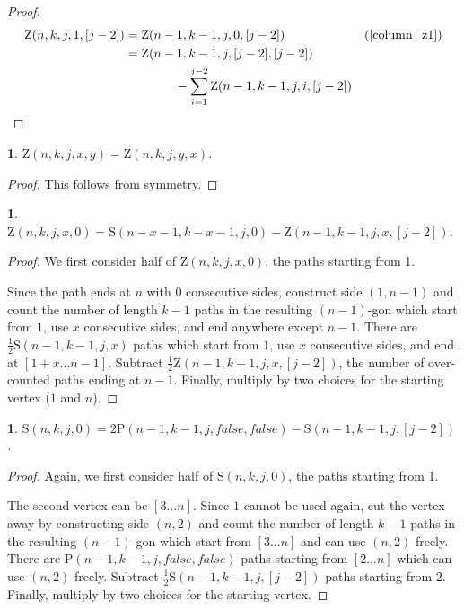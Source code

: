 \documentclass[a4paper, 12pt] {article}
\theoremstyle{remark}
\theoremstyle{plain}
\newcommand{\thistheoremname}{}
\newtheorem{genericthm}[theorem]{\thistheoremname}
\newenvironment{namedthm}[1]
  {\renewcommand{\thistheoremname}{#1}
   \begin{genericthm}}
  {\end{genericthm}}
\theoremstyle{remark}
\begin{document}
\begin{proof}
	\begin{align*}
		\mathrm{Z}(n,k,j,1,[j-2]) &=\mathrm{Z}(n-1,k-1,j,0,[j-2]) &&\text{(\ref{column_z1})} \\
		&=\mathrm{Z}(n-1,k-1,j,[j-2],[j-2]) \\
		&\qquad\qquad - \sum_{i=1}^{j-2} \mathrm{Z}(n-1,k-1,j,i,[j-2]) &&\qedhere
	\end{align*}
\end{proof}


\begin{namedthm}{Symmetry Theorem Z}
\label{symmetry_z}
$\mathrm{Z}(n,k,j,x,y)=\mathrm{Z}(n,k,j,y,x)$.
\end{namedthm}

\begin{proof}
This follows from symmetry.
\end{proof}


\begin{namedthm}{Complement Theorem}
\label{complement}
$\mathrm{Z}(n,k,j,x,0)=\mathrm{S}(n-x-1,k-x-1,j,0)-\mathrm{Z}(n-1,k-1,j,x,[j-2])$.
\end{namedthm}

\begin{proof}
We first consider half of $\mathrm{Z}(n,k,j,x,0)$, the paths starting from 1.

Since the path ends at $n$ with $0$ consecutive sides, construct side $(1,n-1)$ and count the number of length $k-1$ paths in the resulting $(n-1)$-gon which start from $1$, use $x$ consecutive sides, and end anywhere except $n-1$. There are $\frac{1}{2}\mathrm{S}(n-1,k-1,j,x)$ paths which start from $1$, use $x$ consecutive sides, and end at $[1+x...n-1]$. Subtract $\frac{1}{2}\mathrm{Z}(n-1,k-1,j,x,[j-2])$, the number of over-counted paths ending at $n-1$. Finally, multiply by two choices for the starting vertex ($1$ and $n$).
\end{proof}


\begin{namedthm}{Vertex Removal Theorem S1}
\label{vertex_removal_s1}
$\mathrm{S}(n,k,j,0)=2\mathrm{P}(n-1,k-1,j,false, \allowbreak false)-\mathrm{S}(n-1,k-1,j,[j-2])$.
\end{namedthm}

\begin{proof}
Again, we first consider half of $\mathrm{S}(n,k,j,0)$, the paths starting from 1.

The second vertex can be $[3...n]$. Since $1$ cannot be used again, cut the vertex away by constructing side $(n,2)$ and count the number of length $k-1$ paths in the resulting $(n-1)$-gon which start from $[3...n]$ and can use $(n,2)$ freely. There are $\mathrm{P}(n-1,k-1,j,false,false)$ paths starting from $[2...n]$ which can use $(n,2)$ freely. Subtract $\frac{1}{2}\mathrm{S}(n-1,k-1,j,[j-2])$ paths starting from $2$. Finally, multiply by two choices for the starting vertex.
\end{proof}
\end{document}
